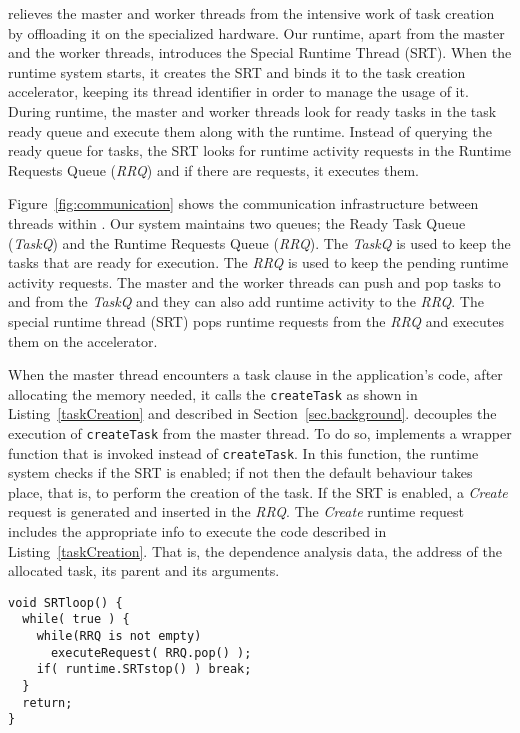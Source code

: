 {\proposal} relieves the master and worker threads from the intensive work of task creation by offloading it on the specialized hardware.
Our runtime, apart from the master and the worker threads, introduces the Special Runtime Thread (SRT). 
When the runtime system starts, it creates the SRT and binds it to the task creation accelerator, keeping its thread identifier in order to manage the usage of it.
During runtime, the master and worker threads look for ready tasks in the task ready queue and execute them along with the runtime.
Instead of querying the ready queue for tasks, the SRT looks for runtime activity requests in the Runtime Requests Queue (\textit{RRQ}) and if there are requests, it executes them.

Figure~\ref{fig:communication} shows the communication infrastructure between threads within {\proposal}.
Our system maintains two queues; the Ready Task Queue (\textit{TaskQ}) and the Runtime Requests Queue (\textit{RRQ}).
The \textit{TaskQ} is used to keep the tasks that are ready for execution. 
The \textit{RRQ} is used to keep the pending runtime activity requests. 
The master and the worker threads can push and pop tasks to and from the \textit{TaskQ} and they can also add runtime activity to the \textit{RRQ}. 
The special runtime thread (SRT) pops runtime requests from the \textit{RRQ} and executes them on the accelerator.

When the master thread encounters a task clause in the application's code, after allocating the memory needed, it calls the \texttt{createTask} as shown in Listing~\ref{taskCreation} and described in Section~\ref{sec.background}. 
{\proposal} decouples the execution of \texttt{createTask} from the master thread. 
To do so, {\proposal} implements a wrapper function that is invoked instead of \texttt{createTask}.
In this function, the runtime system checks if the SRT is enabled; if not then the default behaviour takes place, that is, to perform the creation of the task.
If the SRT is enabled, a \textit{Create} request is generated and inserted in the \textit{RRQ}.
The \textit{Create} runtime request includes the appropriate info to execute the code described in Listing~\ref{taskCreation}.
That is, the dependence analysis data, the address of the allocated task, its parent and its arguments.



\begin{lstlisting}[float, emph={void,if,return,non_critical_queue, critical_queue,not,true,and,break}, captionpos=b, caption={Pseudo-code for the SRT loop.},label=SRTloop, emph={[2]mat}, emphstyle={[2]}, aboveskip={0\baselineskip}, frame=tb, belowskip={0\baselineskip}]
void SRTloop() {
  while( true ) {   
    while(RRQ is not empty) 
      executeRequest( RRQ.pop() );
    if( runtime.SRTstop() ) break;
  }
  return; 
}  
\end{lstlisting}

